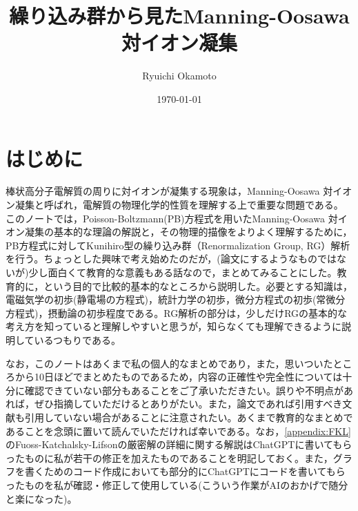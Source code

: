 \documentclass[11pt,a4paper]{ltjsarticle}
\title{繰り込み群から見たManning-Oosawa 対イオン凝集}
\author{Ryuichi Okamoto}
\date{\today}
\theoremstyle{definition}
\theoremstyle{remark}
\begin{document}
\maketitle
\tableofcontents


\section{はじめに}
棒状高分子電解質の周りに対イオンが凝集する現象は，Manning-Oosawa 対イオン凝集と呼ばれ\cite{Manning1969_I,Manning1969_II,Oosawa1971}，電解質の物理化学的性質を理解する上で重要な問題である。
このノートでは，Poisson-Boltzmann(PB)方程式を用いたManning-Oosawa 対イオン凝集の基本的な理論の解説と，その物理的描像をよりよく理解するために，PB方程式に対してKunihiro型の繰り込み群（Renormalization Group, RG）\cite{Kunihiro1995,Kunihiro1997}解析を行う。ちょっとした興味で考え始めたのだが，(論文にするようなものではないが)少し面白くて教育的な意義もある話なので，まとめてみることにした。教育的に，という目的で比較的基本的なところから説明した。必要とする知識は，電磁気学の初歩(静電場の方程式)，統計力学の初歩，微分方程式の初歩(常微分方程式)，摂動論の初歩程度である。RG解析の部分は，少しだけRGの基本的な考え方を知っていると理解しやすいと思うが，知らなくても理解できるように説明しているつもりである。

なお，このノートはあくまで私の個人的なまとめであり，また，思いついたところから10日ほどでまとめたものであるため，内容の正確性や完全性については十分に確認できていない部分もあることをご了承いただきたい。誤りや不明点があれば，ぜひ指摘していただけるとありがたい。また，論文であれば引用すべき文献も引用していない場合があることに注意されたい。あくまで教育的なまとめであることを念頭に置いて読んでいただければ幸いである。なお，\ref{appendix:FKL}のFuoss-Katchalsky-Lifsonの厳密解の詳細に関する解説はChatGPTに書いてもらったものに私が若干の修正を加えたものであることを明記しておく。また，グラフを書くためのコード作成においても部分的にChatGPTにコードを書いてもらったものを私が確認・修正して使用している(こういう作業がAIのおかげで随分と楽になった)。
\end{document}
